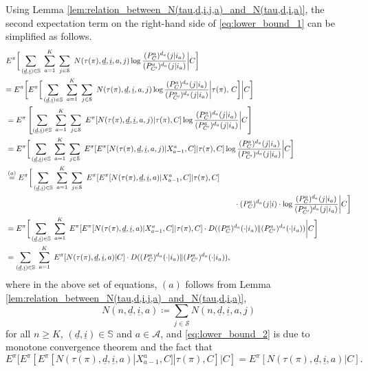 Using Lemma \ref{lem:relation_between_N(tau,d,i,j,a)_and_N(tau,d,i,a)}, the second expectation term on the right-hand side of \eqref{eq:lower_bound_1} can be simplified as follows.
\begingroup \allowdisplaybreaks\begin{align}
	& E^\pi\bigg[\sum\limits_{(\underline{d},\underline{i})\in\mathbb{S}}~\sum\limits_{a=1}^{K}~\sum\limits_{j\in\mathcal{S}}~N(\tau(\pi),\underline{d},\underline{i},a,j)\log\frac{(P_C^{a})^{d_a}(j|i_a)}{(P_{C'}^{a})^{d_a}(j|i_a)}\bigg\vert C\bigg]\nonumber\\
	&{\color{black} =E^{\pi}\bigg[E^{\pi}\bigg[\sum\limits_{(\underline{d},\underline{i})\in\mathbb{S}}~\sum\limits_{a=1}^{K}~\sum\limits_{j\in\mathcal{S}}~N(\tau(\pi),\underline{d},\underline{i},a,j)\log\frac{(P_C^{a})^{d_a}(j|i_a)}{(P_{C'}^{a})^{d_a}(j|i_a)}\bigg\vert \tau(\pi),\,C\bigg]\bigg\vert C\bigg]}\nonumber\\
	&={\color{black} E^\pi\left[\sum\limits_{(\underline{d},\underline{i})\in\mathbb{S}}~\sum\limits_{a=1}^{K}~\sum\limits_{j\in\mathcal{S}}~E^\pi[N(\tau(\pi),\underline{d},\underline{i},a,j)|\tau(\pi),C]\log\frac{(P_C^{a})^{d_a}(j|i_a)}{(P_{C'}^{a})^{d_a}(j|i_a)}\bigg|C\right]}\nonumber\\
	&=E^\pi\bigg[\sum\limits_{(\underline{d},\underline{i})\in\mathbb{S}}~\sum\limits_{a=1}^{K}~\sum\limits_{j\in\mathcal{S}}~E^\pi[E^\pi[N(\tau(\pi),\underline{d},\underline{i},a,j)|X_{a-1}^a,C]|\tau(\pi),C]\log\frac{(P_C^{a})^{d_a}(j|i_a)}{(P_{C'}^{a})^{d_a}(j|i_a)}\bigg|C\bigg]\nonumber\\
	&\stackrel{(a)}{=} E^\pi\bigg[\sum\limits_{(\underline{d},\underline{i})\in\mathbb{S}}~\sum\limits_{a=1}^{K}~\sum\limits_{j\in\mathcal{S}}~E^\pi[E^\pi[N(\tau(\pi),\underline{d},\underline{i},a)|X_{a-1}^a,C]|\tau(\pi),C]\nonumber\\
	&\hspace{10.5cm}\cdot (P_C^a)^{d_a}(j|i)\cdot\log\frac{(P_C^{a})^{d_a}(j|i_a)}{(P_{C'}^{a})^{d_a}(j|i_a)}{\color{black}\bigg\vert C}\bigg]\nonumber\\
	&= E^\pi\bigg[\sum\limits_{(\underline{d},\underline{i})\in\mathbb{S}}~\sum\limits_{a=1}^{K}~E^\pi[E^\pi[N(\tau(\pi),\underline{d},\underline{i},a)|X_{a-1}^a,C]|\tau(\pi),C]\cdot D((P_C^a)^{d_a}(\cdot|i_a)\|(P_{C'}^a)^{d_a}(\cdot|i_a)){\color{black}\bigg\vert C}\bigg]\nonumber\\
	&=\sum\limits_{(\underline{d},\underline{i})\in\mathbb{S}}~\sum\limits_{a=1}^{K}~E^\pi[N(\tau(\pi),\underline{d},\underline{i},a)|C]\cdot D((P_C^a)^{d_a}(\cdot|i_a)\|(P_{C'}^a)^{d_a}(\cdot|i_a)),\label{eq:lower_bound_2}
\end{align}\endgroup
where in the above set of equations, $(a)$ follows from Lemma \ref{lem:relation_between_N(tau,d,i,j,a)_and_N(tau,d,i,a)}, $$ N(n, \underline{d}, \underline{i}, a)\coloneqq \sum\limits_{j\in \mathcal{S}} N(n, \underline{d}, \underline{i}, a, j) $$ for all $n\geq K$, $(\underline{d}, \underline{i})\in \mathbb{S}$ and $a\in \mathcal{A}$,
and \eqref{eq:lower_bound_2} is due to monotone convergence theorem and the fact that $$E^\pi[E^\pi[E^\pi[N(\tau(\pi),\underline{d},\underline{i},a)|X_{a-1}^a,C]|\tau(\pi),C]|C]=E^\pi[N(\tau(\pi),\underline{d},\underline{i},a)|C].$$

